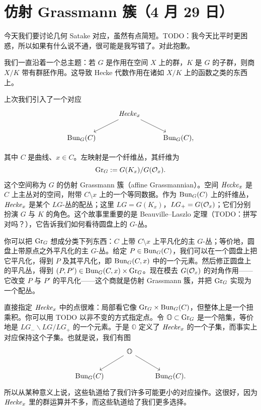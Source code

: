 \section[仿射 Grassmann 簇]{仿射 Grassmann 簇（4 月 29 日）}


今天我们要讨论几何 Satake 对应，虽然有点简短。TODO：我今天比平时更困惑，所以如果有什么说不通，很可能是我写错了。对此抱歉。

我们一直沿着一个总主题：若 $G$ 是作用在空间 $X$ 上的群，$K$ 是 $G$ 的子群，则商 $X/K$ 带有群胚作用。这导致 Hecke 代数作用在诸如 $X/K$ 上的函数之类的东西上。

上次我们引入了一个对应
\[
  \begin{tikzcd}
    & \Hck_x \arrow[dl] \arrow[dr] & \\
    \Bun_G(C) & & \Bun_G(C),
  \end{tikzcd}
\]


其中 $C$ 是曲线、$x\in C$。左映射是一个纤维丛，其纤维为
\[
  \mathrm{Gr}_G := G(K_x)/G(\mathcal{O}_x).
\]
这个空间称为 $G$ 的仿射 Grassmann 簇（affine Grassmannian）。空间 $\mathit{Hecke}_x$ 是 $C$ 上主丛对的空间，附带 $C\setminus x$ 上的一个等同数据。作为 $\mathrm{Bun}_G(C)$ 上的纤维丛，$\mathit{Hecke}_x$ 是某个 $LG$-丛的配丛；这里 $LG=G(K_x)$，$LG_+=G(\mathcal{O}_x)$；它们分别扮演 $G$ 与 $K$ 的角色。这个故事里重要的是 Beauville–Laszlo 定理（TODO：拼写对吗？），它告诉我们如何看待圆盘上的 $G$-丛。

你可以把 $\mathrm{Gr}_G$ 想成分类下列东西：$C$ 上带 $C\setminus x$ 上平凡化的主 $G$-丛；等价地，圆盘上带原点之外平凡化的主 $G$-丛。给定 $P\in\mathrm{Bun}_G(C)$，我们可以在一个圆盘上把它平凡化，得到 $P$ 及其平凡化，即 $\mathrm{Bun}_G(C,x)$ 中的一个元素。然后修正圆盘上的平凡丛，得到 $(P,P')\in\mathrm{Bun}_G(C,x)\times\mathrm{Gr}_G$。现在模去 $G(\mathcal{O}_x)$ 的对角作用——它改变 $P$ 与 $P'$ 的平凡化——这个商就是仿射 Grassmann 簇，并把 $\mathrm{Gr}_G$ 实现为一个配丛。

直接指定 $\mathit{Hecke}_x$ 中的点很难：局部看它像 $\mathrm{Gr}_G\times\mathrm{Bun}_G(C)$，但整体上是一个扭乘积。你可以用 TODO 以非不变的方式指定点。令 $\mathbb{O}\subset\mathrm{Gr}_G$ 是一个陪集，等价地是 $LG_-\backslash LG/LG_+$ 的一个元素。于是 $\mathbb{O}$ 定义了 $\mathit{Hecke}_x$ 的一个子集，而事实上对应保持这个子集。也就是说，我们有图
\[
  \begin{tikzcd}
    & \mathbb{O} \arrow[dl] \arrow[dr] & \\
    \Bun_G(C) & & \Bun_G(C).
  \end{tikzcd}
\]
所以从某种意义上说，这些轨道给了我们许多可能更小的对应操作。这很好，因为 $\mathit{Hecke}_x$ 里的群运算并不多，而这些轨道给了我们更多选择。

